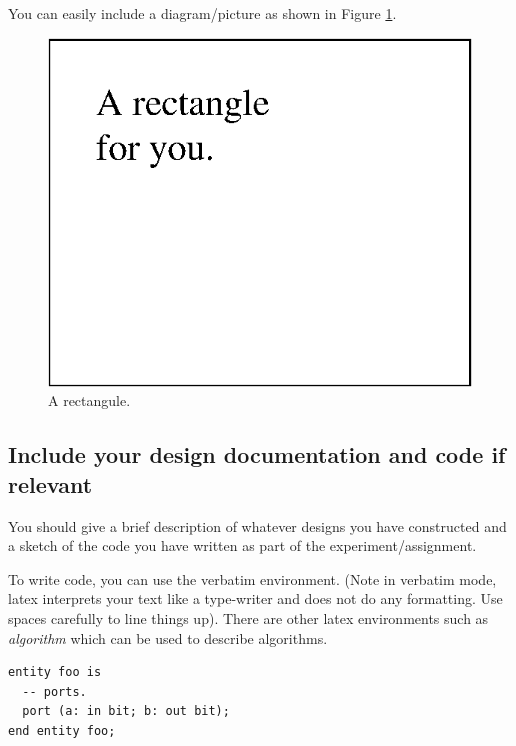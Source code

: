 \documentclass[12pt]{article}
\begin{document}
%
%
%
You can easily include a diagram/picture as shown in Figure \ref{fig:demofig}.
\begin{figure}
  \centering
  \includegraphics[scale=0.9]{figs/rectangle.eps}  %
  \caption{A rectangule.}
  \label{fig:demofig}
\end{figure}

\subsection{Include your design documentation and code if relevant}

You should give a brief description of whatever
designs you have constructed and a sketch of
the code you have written as part of the experiment/assignment.

To write code, you can use the verbatim environment.
(Note in verbatim mode, latex interprets your
text like a type-writer and does not do any formatting.  
Use spaces carefully to line things up).  There are other
latex environments such as {\em algorithm} which can 
be used to describe algorithms.
\begin{verbatim}
entity foo is
  -- ports.
  port (a: in bit; b: out bit);
end entity foo;
\end{verbatim}
\end{document}
